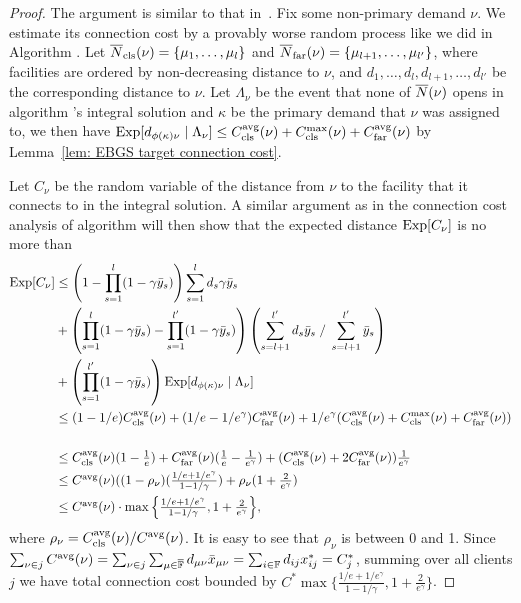 \begin{proof}
  The argument is similar to that in~\cite{ByrkaGS10}. Fix some
  non-primary demand $\nu$. We estimate its connection cost by a
  provably worse random process like we did in Algorithm {\ECHS}. Let
  ${\overline{N}}_{{\mbox{\scriptsize\rm cls}}}(\nu) = \{\mu_1,\ldots,\mu_l\}$ and ${\overline{N}}_{{\mbox{\scriptsize\rm far}}}(\nu) =
  \{\mu_{l+1}, \ldots, \mu_{l'}\}$, where facilities are ordered by
  non-decreasing distance to $\nu$, and
  $d_1,\ldots,d_l,d_{l+1},\ldots,d_{l'}$ be the corresponding distance
  to $\nu$. Let $\Lambda_{\nu}$ be the event that none of
  ${\overline{N}}(\nu)$ opens in algorithm {\EBGS}'s integral solution and
  $\kappa$ be the primary demand that $\nu$ was assigned to, we then
  have $\mbox{\rm Exp}[d_{\phi(\kappa)\nu}\mid \Lambda_{\nu}] \leq C_{{\mbox{\scriptsize\rm cls}}}^{{\mbox{\scriptsize\rm avg}}}(\nu)
  + C_{{\mbox{\scriptsize\rm cls}}}^{\max}(\nu) + C_{{\mbox{\scriptsize\rm far}}}^{{\mbox{\scriptsize\rm avg}}}(\nu)$ by Lemma~\ref{lem: EBGS target
    connection cost}.

  Let $C_{\nu}$ be the random variable of the distance from $\nu$ to
  the facility that it connects to in the integral solution. A similar
  argument as in the connection cost analysis of algorithm {\ECHS}
  will then show that the expected distance $\mbox{\rm Exp}[C_\nu]$ is no more
  than
  \begin{align*}
    \mbox{\rm Exp}[C_{\nu}] 
    &\leq \left(1-\prod_{s=1}^l (1-\gamma{\bar y}_s)\right) \sum_{s=1}^l d_s \gamma{\bar y}_s\\
    &+ \left(\prod_{s=1}^l(1-\gamma{\bar y}_s) - \prod_{s=1}^{l'}(1-\gamma{\bar y}_s)\right) \left(\sum_{s=l+1}^{l'} d_s{\bar y}_s\;/ \;\sum_{s=l+1}^{l'} {\bar y}_s \right)\\
    &+ \left(\prod_{s=1}^{l'} (1-\gamma{\bar y}_s)\right) \mbox{\rm Exp}[d_{\phi(\kappa)\nu} \mid \Lambda_\nu]\\
    &\leq (1-1/e)C_{{\mbox{\scriptsize\rm cls}}}^{{\mbox{\scriptsize\rm avg}}}(\nu) + (1/e - 1/e^\gamma)C_{{\mbox{\scriptsize\rm far}}}^{{\mbox{\scriptsize\rm avg}}}(\nu) + 1/e^\gamma (C_{{\mbox{\scriptsize\rm cls}}}^{{\mbox{\scriptsize\rm avg}}}(\nu) + C_{{\mbox{\scriptsize\rm cls}}}^{\max}(\nu) + C_{{\mbox{\scriptsize\rm far}}}^{{\mbox{\scriptsize\rm avg}}}(\nu))\\
\\
  &\leq 
	\textstyle
	C_{{\mbox{\scriptsize\rm cls}}}^{{\mbox{\scriptsize\rm avg}}}(\nu)(1-\frac{1}{e}) + C_{{\mbox{\scriptsize\rm far}}}^{{\mbox{\scriptsize\rm avg}}}(\nu)(\frac{1}{e}-\frac{1}{e^\gamma})
	 			+ (C_{{\mbox{\scriptsize\rm cls}}}^{{\mbox{\scriptsize\rm avg}}}(\nu)+2C_{{\mbox{\scriptsize\rm far}}}^{{\mbox{\scriptsize\rm avg}}}(\nu))\frac{1}{e^\gamma}
\\
  &\leq
	\textstyle
  C^{{\mbox{\scriptsize\rm avg}}}(\nu)((1-\rho_{\nu})(\frac{1/e+1/e^\gamma}{1-1/\gamma})
  + \rho_{\nu}(1+\frac{2}{e^\gamma}) 
\\
  &\leq 
	\textstyle
	C^{{\mbox{\scriptsize\rm avg}}}(\nu) \cdot \max\Big\{\frac{1/e+1/e^\gamma}{1-1/\gamma},
  								1+\frac{2}{e^\gamma}\Big\},
\end{align*}
%
where $\rho_{\nu}=C_{{\mbox{\scriptsize\rm cls}}}^{{\mbox{\scriptsize\rm avg}}}(\nu)/C^{{\mbox{\scriptsize\rm avg}}}(\nu)$. It is easy to see that
$\rho_{\nu}$ is between 0 and 1. Since $\sum_{\nu\in j} C^{{\mbox{\scriptsize\rm avg}}}(\nu)
= \sum_{\nu\in j}\sum_{\mu\in\overline{\mathbb{F}}} d_{\mu\nu}{\bar x}_{\mu\nu} =
\sum_{i\in\mathbb{F}} d_{ij}x_{ij}^\ast = C_j^\ast$, summing over all
clients $j$ we have total connection cost bounded by $C^\ast
\max\{\frac{1/e+1/e^\gamma}{1-1/\gamma}, 1+\frac{2}{e^\gamma}\}$.
\end{proof}

